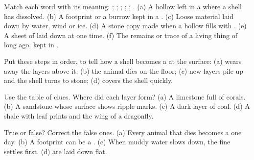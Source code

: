 \begin{exercise}[$\star$]\label{exo:g7:sediments-and-fossils:1}
Match each word with its meaning: ; ; ; ;
; . (a) A hollow left in a  where a shell has
dissolved. (b) A footprint or a burrow kept in a . (c) Loose material
laid down by water, wind or ice. (d) A stone copy made when a hollow
fills with . (e) A sheet of  laid down at one time. (f)
The remains or trace of a living thing of long ago, kept in .
\end{exercise}

\begin{exercise}[$\star$]\label{exo:g7:sediments-and-fossils:2}
Put these steps in order, to tell how a shell becomes a  at the
surface: (a)  wears away the layers above it; (b) the animal dies
on the  floor; (c) new layers pile up and the shell turns to stone;
(d)  covers the shell quickly.
\end{exercise}

\begin{exercise}[$\star$]\label{exo:g7:sediments-and-fossils:3}
Use the table of clues. Where did each layer form? (a) A limestone full
of corals. (b) A sandstone whose surface shows ripple marks. (c) A dark
layer of coal. (d) A shale with leaf prints and the wing of a dragonfly.
\end{exercise}

\begin{exercise}[$\star$]\label{exo:g7:sediments-and-fossils:4}
True or false? Correct the false ones. (a) Every animal that dies
becomes a  one day. (b) A footprint can be a . (c) When muddy
water slows down, the fine  settles first. (d)  are laid
down flat.
\end{exercise}

